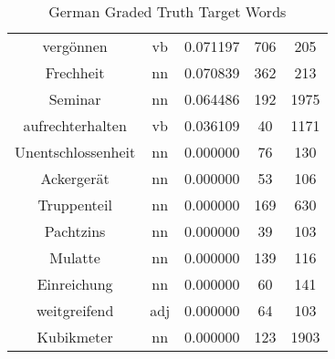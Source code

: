 \begin{table}
\begin{tabular}{ccccc}
vergönnen          & vb            & 0.071197           & 706                & 205                 \\
Frechheit          & nn            & 0.070839           & 362                & 213                 \\
Seminar            & nn            & 0.064486           & 192                & 1975                \\
aufrechterhalten   & vb            & 0.036109           & 40                 & 1171                \\
Unentschlossenheit & nn            & 0.000000           & 76                 & 130                 \\
Ackergerät         & nn            & 0.000000           & 53                 & 106                 \\
Truppenteil        & nn            & 0.000000           & 169                & 630                 \\
Pachtzins          & nn            & 0.000000           & 39                 & 103                 \\
Mulatte            & nn            & 0.000000           & 139                & 116                 \\
Einreichung        & nn            & 0.000000           & 60                 & 141                 \\
weitgreifend       & adj           & 0.000000           & 64                 & 103                 \\
Kubikmeter         & nn            & 0.000000           & 123                & 1903                \\
\bottomrule
\end{tabular}
\caption{German Graded Truth Target Words}
\label{tab:deu-truthtargets}
\end{table}


